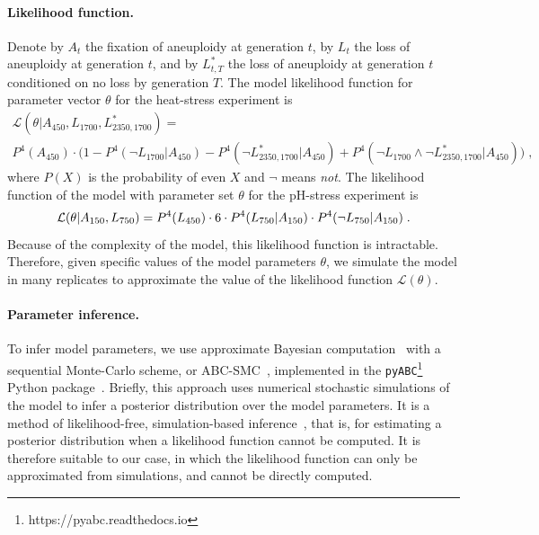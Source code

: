 \documentclass[12pt]{extarticle}
\newcommand{\likelihood}{\mathcal{L}}
\begin{document}
\paragraph{Likelihood function.}
Denote by $A_{t}$ the fixation of aneuploidy at generation $t$, by $L_{t}$ the loss of aneuploidy at generation $t$, and by $L^*_{t,T}$ the loss of aneuploidy at generation $t$ conditioned on no loss by generation $T$.
The model likelihood function for parameter vector $\theta$ for the heat-stress experiment is
\begin{multline} \label{eq:heatstress-likelihood}
\likelihood(\theta | A_{450}, L_{1700}, L^*_{2350, 1700} ) = \\
P^4(A_{450}) \cdot \Big(1 - P^4(\lnot{L_{1700}} | A_{450} ) - P^4(\lnot{L^*_{2350, 1700}}| A_{450}) + P^4(\lnot{L_{1700}} \land \lnot{L^*_{2350, 1700}}| A_{450})\Big)	\;,	
\end{multline}
where $P(X)$ is the probability of even $X$ and $\lnot$ means \emph{not}.
The likelihood function of the model with parameter set $\theta$ for the pH-stress experiment is
\begin{equation} \label{eq:phstress-likelihood}
\likelihood(\theta | A_{150}, L_{750} ) = \\
 P^4(L_{450}) \cdot 6 \cdot	P^4(L_{750} | A_{150}) \cdot P^4(\lnot{L_{750}} | A_{150}) \;.
\end{equation} 
Because of the complexity of the model, this likelihood function is intractable. Therefore, given specific values of the model parameters $\theta$, we simulate the model in many replicates to approximate the value of the likelihood function $\likelihood(\theta)$.

\paragraph{Parameter inference.} To infer model parameters, we use approximate Bayesian computation~\citep{Sunnaker2013} with a sequential Monte-Carlo scheme, or ABC-SMC~\citep{Sisson2009}, implemented in the \texttt{pyABC}\footnote{https://pyabc.readthedocs.io} Python 
package~\citep{Klinger2018}.
Briefly, this approach uses numerical stochastic simulations of the model to infer a posterior distribution over the model parameters. It is a method of likelihood-free, simulation-based inference~\citep{Cranmer2020}, that is, for estimating a posterior distribution when a likelihood function cannot be computed. It is therefore suitable to our case, in which the likelihood function can only be approximated from simulations, and cannot be directly computed. 
\end{document}
